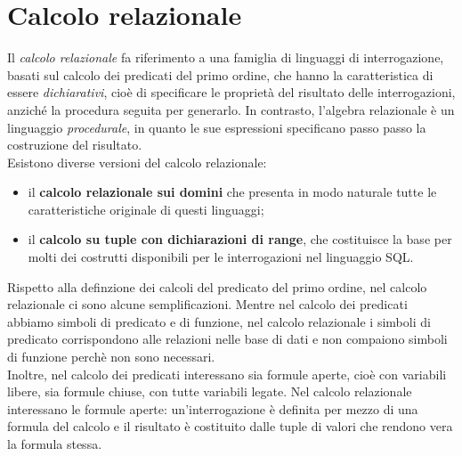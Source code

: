\documentclass[12pt]{report}
\begin{document}
 	\section{Calcolo relazionale}
 	Il \textit{calcolo relazionale} fa riferimento a una famiglia di linguaggi di interrogazione, basati sul calcolo dei predicati del primo ordine, che hanno la caratteristica di essere \textit{dichiarativi}, cioè di specificare le proprietà del risultato delle interrogazioni, anziché la procedura seguita per generarlo. In contrasto, l'algebra relazionale è un linguaggio \textit{procedurale}, in quanto le sue espressioni specificano passo passo la costruzione del risultato. \\
 	Esistono diverse versioni del calcolo relazionale:
 	\begin{itemize}
 		\item il \textbf{calcolo relazionale sui domini} che presenta in modo naturale tutte le caratteristiche originale di questi linguaggi;
 		\item il \textbf{calcolo su tuple con dichiarazioni di range}, che costituisce la base per molti dei costrutti disponibili per le interrogazioni nel linguaggio SQL.
 	\end{itemize}
 	Rispetto alla definzione dei calcoli del predicato del primo ordine, nel calcolo relazionale ci sono alcune semplificazioni. Mentre nel calcolo dei predicati abbiamo simboli di predicato e di funzione, nel calcolo relazionale i simboli di predicato corrispondono alle relazioni nelle base di dati e non compaiono simboli di funzione perchè non sono necessari. \\
 	Inoltre, nel calcolo dei predicati interessano sia formule aperte, cioè con variabili libere, sia formule chiuse, con tutte variabili legate. Nel calcolo relazionale interessano le formule aperte: un'interrogazione è definita per mezzo di una formula del calcolo e il risultato è costituito dalle tuple di valori che rendono vera la formula stessa.
\end{document}
